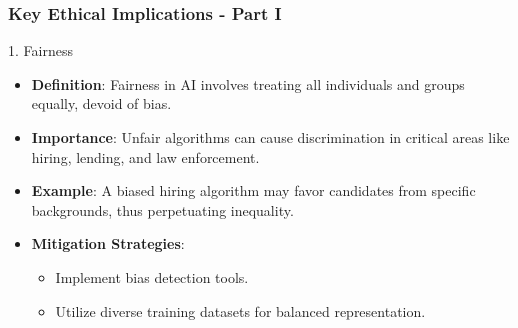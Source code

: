 \documentclass[aspectratio=169]{beamer}
\begin{document}
\begin{frame}[fragile]
    \frametitle{Key Ethical Implications - Part I}
    \begin{block}{1. Fairness}
        \begin{itemize}
            \item \textbf{Definition}: Fairness in AI involves treating all individuals and groups equally, devoid of bias.
            \item \textbf{Importance}: Unfair algorithms can cause discrimination in critical areas like hiring, lending, and law enforcement.
            \item \textbf{Example}: A biased hiring algorithm may favor candidates from specific backgrounds, thus perpetuating inequality.
            \item \textbf{Mitigation Strategies}: 
            \begin{itemize}
                \item Implement bias detection tools.
                \item Utilize diverse training datasets for balanced representation.
            \end{itemize}
        \end{itemize}
    \end{block}
\end{frame}
\end{document}
